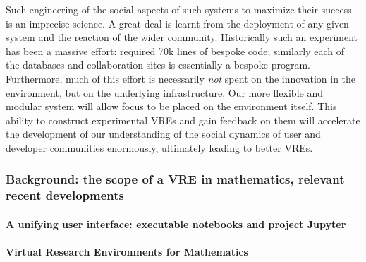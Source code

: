Such engineering of the social aspects of such systems to maximize their
success is an imprecise science. A great deal is learnt from the
deployment of any given system and the reaction of the wider
community. Historically such an experiment has been a massive effort:
\SMC required 70k lines of bespoke code; similarly each of
the databases and collaboration sites is essentially a bespoke
program. Furthermore, much of this effort is necessarily \emph{not} spent on
the innovation in the environment, but on the underlying
infrastructure. Our more flexible and modular system will allow
focus to be placed on the environment
itself. This ability to construct experimental VREs and gain feedback
on them will accelerate the development of  our understanding
of the social dynamics of user and developer communities enormously,
ultimately leading to better VREs.

\subsubsection{Background: the scope of a VRE in mathematics, relevant
  recent developments}

\paragraph{A unifying user interface: executable notebooks and project Jupyter}





\paragraph{Virtual Research Environments for Mathematics}\





